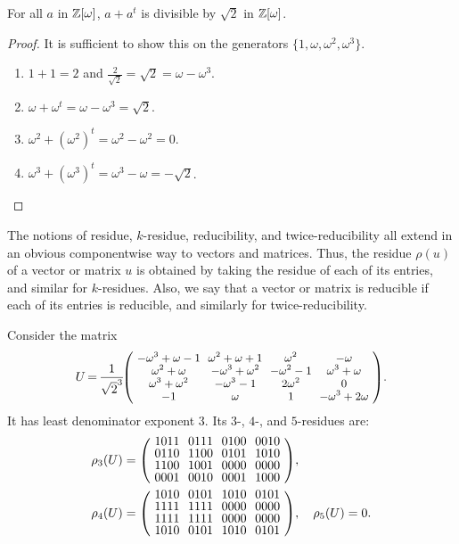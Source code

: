 \begin{lemma}\label{lem-divisiblebyroot2}
  For all $a$ in $\mathbb{Z}[\omega]$, $a+a^t$ is divisible by $\sqrt{2}$ in $\mathbb{Z}[\omega]$.
\end{lemma}
\begin{proof}
  It is sufficient to show this on the generators $\{1,\omega,\omega^2,\omega^3\}$.
  \begin{enumerate}
    \item $1+1 = 2$ and $\frac{2}{\sqrt{2}} = \sqrt{2} = \omega-\omega^3$.
    \item $\omega+\omega^t = \omega-\omega^3 = \sqrt{2}$.
    \item $\omega^2+(\omega^2)^t = \omega^2 - \omega^2 = 0$.
    \item $\omega^3+(\omega^3)^t = \omega^3 - \omega = -\sqrt{2}$.
  \end{enumerate}
\end{proof}

\begin{definition}
  The notions of residue, $k$-residue, reducibility, and twice-reducibility all extend in an
  obvious componentwise way to vectors and matrices. Thus, the residue $\rho(u)$ of a vector or
  matrix $u$ is obtained by taking the residue of each of its entries, and similar for
  $k$-residues. Also, we say that a vector or matrix is reducible if each of its entries is
  reducible, and similarly for twice-reducibility.
\end{definition}


\begin{example}\label{exa-k-residue}
  Consider the matrix
  \[ \small U \,{=}\, \frac{\small 1}{\small \sqrt{2}^3}\!\footnotesize\zmatrix{cccc}{
    -\omega^3+\omega -1          
			& \omega^2+\omega+1 
				& \omega^2 
					& -\omega\\
    \omega^2+\omega 
			& -\omega^3+\omega^2 
				& -\omega^2-1
					& \omega^3+\omega \\
    \omega^3+\omega^2
			& -\omega^3-1
				& 2\omega^2 
					&0 \\
    -1
			& \omega
				& 1 
					& -\omega^3+2\omega
    }.
  \]
  It has least denominator exponent $3$. Its $3$-, $4$-, and $5$-residues are:
  \[ 
    \begin{split}
    &
    \rho_3(U) = \zmatrix{cccc}{
      1011 & 0111 & 0100 & 0010\\
      0110 & 1100 & 0101 & 1010\\
      1100 & 1001 & 0000 & 0000\\
      0001 & 0010 & 0001 & 1000
    },
    \\&
    \rho_4(U) = \zmatrix{cccc}{
      1010 & 0101 & 1010 & 0101\\
      1111 & 1111 & 0000 & 0000\\
      1111 & 1111 & 0000 & 0000\\
      1010 & 0101 & 1010 & 0101
    },\quad
    \rho_5(U) = 0.\end{split}
  \]
\end{example}

